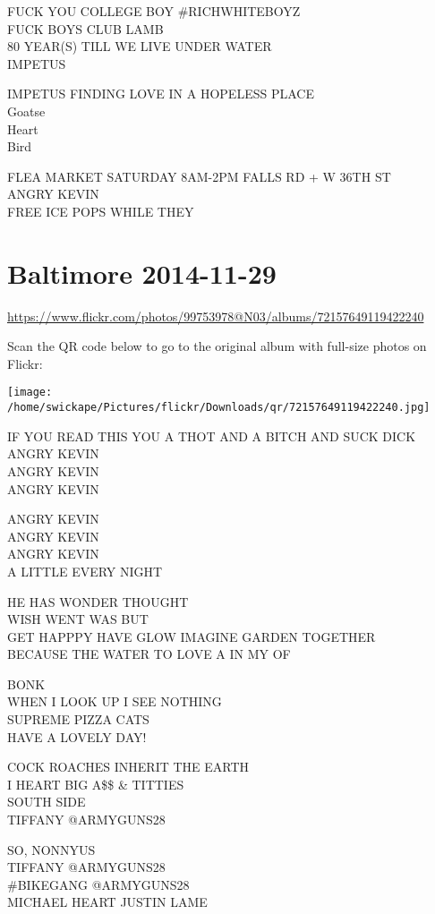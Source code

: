 \documentclass[10pt,letterpaper]{article}
\begin{document}
FUCK YOU COLLEGE BOY \#RICHWHITEBOYZ\\
FUCK BOYS CLUB LAMB\\
80 YEAR(S) TILL WE LIVE UNDER WATER\\
IMPETUS

IMPETUS FINDING LOVE IN A HOPELESS PLACE\\
Goatse\\
Heart\\
Bird

FLEA MARKET SATURDAY 8AM{-}2PM FALLS RD + W 36TH ST\\
ANGRY KEVIN\\
FREE ICE POPS WHILE THEY


\section*{Baltimore 2014-11-29}

\url{https://www.flickr.com/photos/99753978@N03/albums/72157649119422240}

Scan the QR code below to go to the original album with full-size photos on Flickr:

\texttt{[image: /home/swickape/Pictures/flickr/Downloads/qr/72157649119422240.jpg]}


IF YOU READ THIS YOU A THOT AND A BITCH AND SUCK DICK\\
ANGRY KEVIN\\
ANGRY KEVIN\\
ANGRY KEVIN

ANGRY KEVIN\\
ANGRY KEVIN\\
ANGRY KEVIN\\
A LITTLE EVERY NIGHT

HE HAS WONDER THOUGHT\\
WISH WENT WAS BUT\\
GET HAPPPY HAVE GLOW IMAGINE GARDEN TOGETHER\\
BECAUSE THE WATER TO LOVE A IN MY OF

BONK\\
WHEN I LOOK UP I SEE NOTHING\\
SUPREME PIZZA CATS\\
HAVE A LOVELY DAY!

COCK ROACHES INHERIT THE EARTH\\
I HEART BIG A\$\$ \& TITTIES\\
SOUTH SIDE\\
TIFFANY @ARMYGUNS28

SO, NONNYUS\\
TIFFANY @ARMYGUNS28\\
\#BIKEGANG @ARMYGUNS28\\
MICHAEL HEART JUSTIN LAME
\end{document}
